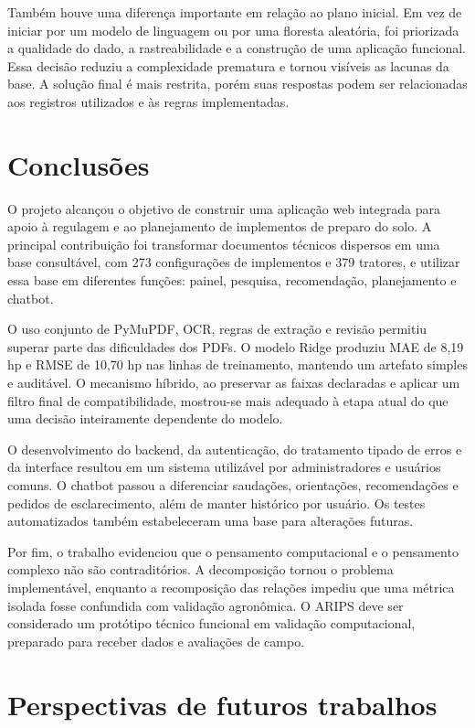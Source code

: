 \documentclass[12pt,a4paper]{article}
\begin{document}
Também houve uma diferença importante em relação ao plano inicial. Em vez de iniciar por um modelo de linguagem ou por uma floresta aleatória, foi priorizada a qualidade do dado, a rastreabilidade e a construção de uma aplicação funcional. Essa decisão reduziu a complexidade prematura e tornou visíveis as lacunas da base. A solução final é mais restrita, porém suas respostas podem ser relacionadas aos registros utilizados e às regras implementadas.

\section{Conclusões}

O projeto alcançou o objetivo de construir uma aplicação web integrada para apoio à regulagem e ao planejamento de implementos de preparo do solo. A principal contribuição foi transformar documentos técnicos dispersos em uma base consultável, com 273 configurações de implementos e 379 tratores, e utilizar essa base em diferentes funções: painel, pesquisa, recomendação, planejamento e chatbot.

O uso conjunto de PyMuPDF, OCR, regras de extração e revisão permitiu superar parte das dificuldades dos PDFs. O modelo Ridge produziu MAE de 8,19 hp e RMSE de 10,70 hp nas linhas de treinamento, mantendo um artefato simples e auditável. O mecanismo híbrido, ao preservar as faixas declaradas e aplicar um filtro final de compatibilidade, mostrou-se mais adequado à etapa atual do que uma decisão inteiramente dependente do modelo.

O desenvolvimento do backend, da autenticação, do tratamento tipado de erros e da interface resultou em um sistema utilizável por administradores e usuários comuns. O chatbot passou a diferenciar saudações, orientações, recomendações e pedidos de esclarecimento, além de manter histórico por usuário. Os testes automatizados também estabeleceram uma base para alterações futuras.

Por fim, o trabalho evidenciou que o pensamento computacional e o pensamento complexo não são contraditórios. A decomposição tornou o problema implementável, enquanto a recomposição das relações impediu que uma métrica isolada fosse confundida com validação agronômica. O ARIPS deve ser considerado um protótipo técnico funcional em validação computacional, preparado para receber dados e avaliações de campo.

\section{Perspectivas de futuros trabalhos}
\end{document}
